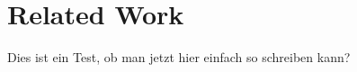 
\chapter{Related Work}
\label{chapter:RelWork}
Dies ist ein Test, ob man jetzt hier einfach so schreiben kann?